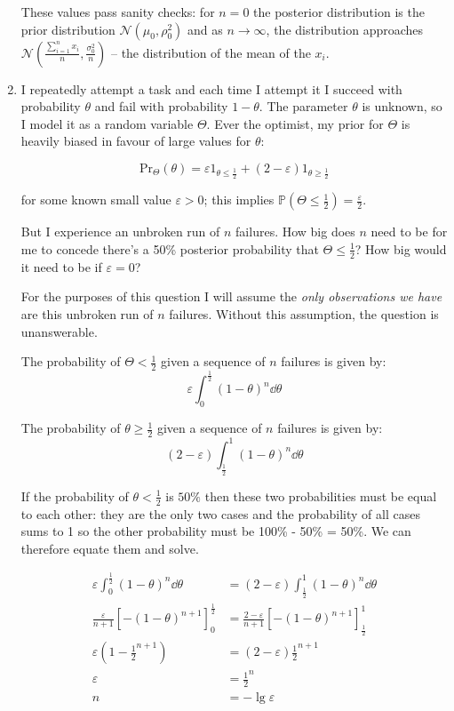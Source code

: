 \documentclass[10pt,\jkfside,a4paper]{article}
\begin{document}
\begin{enumerate}
These values pass sanity checks: for $n=0$ the posterior distribution is the
prior distribution $\mathcal{N}(\mu_0, \rho_0^2)$ and as $n\rightarrow \infty$,
the distribution approaches $\mathcal{N}\left( \frac{\sum^n_{i=1}x_i}{n},
\frac{\sigma^2_0}{n} \right)$ -- the distribution of the mean of the $x_i$.

\item I repeatedly attempt a task and each time I attempt it I succeed with
probability $\theta$ and fail with probability $1 - \theta$. The parameter
$\theta$ is unknown, so I model it as a random variable $\Theta$. Ever the
optimist, my prior for $\Theta$ is heavily biased in favour of large values
for $\theta$:

\[
\text{Pr}_{\Theta}\left( \theta \right) = \varepsilon1_{\theta \leq
\frac{1}{2}} + (2 - \varepsilon)1_{\theta \geq \frac{1}{2}}
\]

for some known small value $\varepsilon > 0$; this implies
$\mathbb{P}\left( \Theta \leq \frac{1}{2} \right) = \frac{\varepsilon}{2}$.

But I experience an unbroken run of $n$ failures. How big does $n$ need to
be for me to concede there's a 50\% posterior probability that
$\Theta \leq \frac{1}{2}$? How big would it need to be if $\varepsilon = 0$?

For the purposes of this question I will assume the \textit{only
observations we have} are this unbroken run of $n$ failures. Without this
assumption, the question is unanswerable.

The probability of $\Theta < \frac{1}{2}$ given a sequence of $n$ failures
is given by:
\[
\varepsilon\int^{\frac{1}{2}}_0 \left( 1 - \theta \right)^n \dd{\theta}
\]

The probability of $\theta \geq \frac{1}{2}$ given a sequence of $n$
failures is given by:
\[
\left( 2 - \varepsilon \right)\int^1_{\frac{1}{2}} \left( 1 - \theta \right)^n
\dd{\theta}
\]

If the probability of $\theta < \frac{1}{2}$ is $50\%$ then these two
probabilities must be equal to each other: they are the only two cases
and the probability of all cases sums to 1 so the other probability must be
100\% - 50\% = 50\%. We can therefore equate them and solve.

\[
\begin{split}
\varepsilon\int^{\frac{1}{2}}_0 \left( 1 - \theta \right)^n \dd{\theta}
&= \left( 2 - \varepsilon \right)\int^1_{\frac{1}{2}} \left( 1 - \theta
\right)^n \dd{\theta} \\
\frac{\varepsilon}{n+1}\left[-\left( 1 - \theta \right)
^{n+1}\right]^{\frac{1}{2}}_0
&= \frac{2 - \varepsilon}{n+1}\left[-\left( 1 - \theta \right)
^{n+1}\right]^1_{\frac{1}{2}} \\
\varepsilon\left( 1 - \frac{1}{2}^{n+1} \right) &= \left( 2 - \varepsilon
\right)\frac{1}{2}^{n+1} \\
\varepsilon &= \frac{1}{2}^{n} \\
n &= -\lg \varepsilon \\
\end{split}
\]


\end{enumerate}
\end{document}
